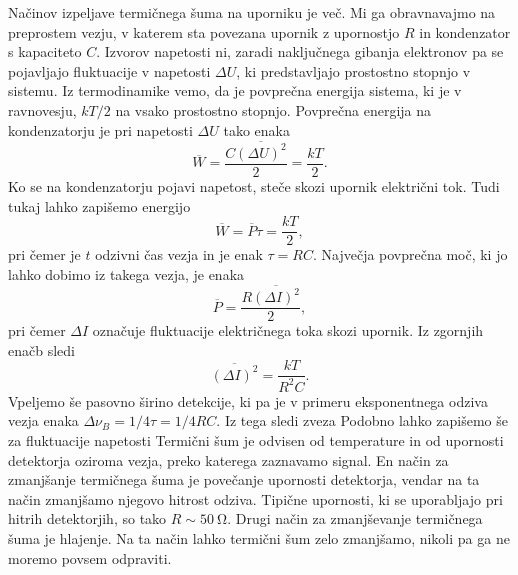 Načinov izpeljave termičnega šuma na uporniku je več. Mi ga obravnavajmo na preprostem vezju, 
v katerem sta povezana upornik z upornostjo $R$ in kondenzator s kapaciteto $C$. Izvorov 
napetosti ni, zaradi naključnega gibanja elektronov pa se pojavljajo fluktuacije v 
napetosti $\Delta U$, ki predstavljajo prostostno stopnjo v sistemu.  
Iz termodinamike vemo, da je povprečna energija sistema, ki je v 
ravnovesju, $kT/2$ na vsako prostostno stopnjo. Povprečna energija na kondenzatorju 
je pri napetosti $\Delta U$ tako enaka
\begin{equation}
\overline{W} = \frac{C\overline{(\Delta U)^2}}{2} = \frac{kT}{2}.
\end{equation}
Ko se na kondenzatorju pojavi napetost, steče skozi upornik električni tok. Tudi tukaj 
lahko zapišemo energijo
\begin{equation}
\overline{W} = \overline{P}\tau = \frac{kT}{2},
\end{equation}
pri čemer je $t$ odzivni čas vezja in je enak $\tau = RC$. Največja povprečna moč, 
ki jo lahko dobimo iz takega vezja, je enaka 
\begin{equation}
\overline{P} = \frac{R \overline{(\Delta I)^2}}{2},
\end{equation}
pri čemer $\Delta I$ označuje fluktuacije električnega toka skozi upornik. Iz zgornjih 
enačb sledi 
\begin{equation}
\overline{(\Delta I)^2} = \frac{kT}{R^2C}.
\end{equation}
Vpeljemo še pasovno širino detekcije, ki pa je v primeru eksponentnega odziva vezja enaka
$\Delta \nu_B = 1/4\tau = 1/4RC$. Iz tega sledi zveza
Podobno lahko zapišemo še za fluktuacije napetosti 
Termični šum je odvisen od temperature in od upornosti detektorja oziroma
vezja, preko katerega zaznavamo signal. En način za zmanjšanje termičnega šuma
je povečanje upornosti detektorja, vendar na ta način zmanjšamo njegovo hitrost
odziva. Tipične upornosti, ki se uporabljajo pri hitrih detektorjih, so 
tako $R \sim 50~\si{\ohm}$. Drugi način za zmanjševanje termičnega šuma je
hlajenje. Na ta način lahko termični šum zelo zmanjšamo, nikoli pa ga ne moremo povsem
odpraviti.  

